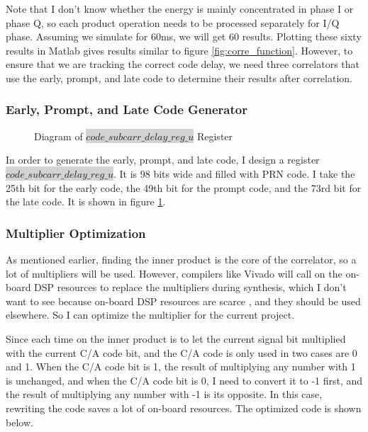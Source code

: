 Note that I don't know whether the energy is mainly concentrated in phase I or phase Q, so each product operation needs to be processed separately for I/Q phase. Assuming we simulate for 60ms, we will get 60 results. Plotting these sixty results in Matlab gives results similar to figure \ref{fig:corre_function}. However, to ensure that we are tracking the correct code delay, we need three correlators that use the early, prompt, and late code to determine their results after correlation.

\subsubsection{Early, Prompt, and Late Code Generator}
\begin{figure}[!htbp]
    \centering
    
    \caption{Diagram of \colorbox{lightgray}{$code\_subcarr\_delay\_reg\_u$} Register}
    \label{fig:prompt_code}
\end{figure}

In order to generate the early, prompt, and late code, I design a register\\ \colorbox{lightgray}{$code\_subcarr\_delay\_reg\_u$}. It is 98 bits wide and filled with PRN  code. I take the 25th bit for the early code, the 49th bit for the prompt code, and the 73rd bit for the late code. It is shown in figure \ref{fig:prompt_code}.

\subsubsection{Multiplier Optimization}
As mentioned earlier, finding the inner product is the core of the correlator, so a lot of multipliers will be used. However, compilers like Vivado will call on the on-board DSP resources to replace the multipliers during synthesis, which I don't want to see because on-board DSP resources are scarce \cite{RN208, RN209}, and they should be used elsewhere. So I can optimize the multiplier for the current project.

Since each time on the inner product is to let the current signal bit multiplied with the current C/A code bit, and the C/A code is only used in two cases are 0 and 1. When the C/A code bit is 1, the result of multiplying any number with 1 is unchanged, and when the C/A code bit is 0, I need to convert it to -1 first, and the result of multiplying any number with -1 is its opposite. In this case, rewriting the code saves a lot of on-board resources. The optimized code is shown below.


